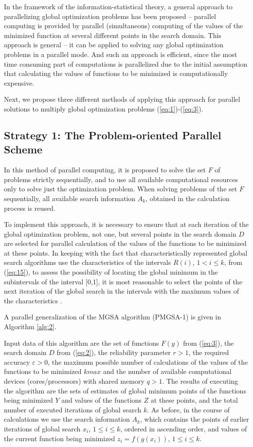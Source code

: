 \documentclass[review]{elsarticle}
\begin{document}
In the framework of the information-statistical theory, a general approach to parallelizing global optimization problems has been proposed -- parallel computing is provided by parallel (simultaneous) computing of the values of the minimized function at several different points in the search domain. This approach is general -- it can be applied to solving any global optimization problems in a parallel mode. And such an approach is efficient, since the most time consuming part of computations is parallelized due to the initial assumption that calculating the values of functions to be minimized is computationally expensive.

Next, we propose three different methods of applying this approach for parallel solutions to multiply global optimization problems (\ref{eq:1})-(\ref{eq:3}).

\subsection{Strategy 1: The Problem-oriented Parallel Scheme} \label{subsec:1}

In this method of parallel computing, it is proposed to solve the set $F$ of problems strictly sequentially, and to use all available computational resources only to solve just the optimization problem. When solving problems of the set $F$ sequentially, all available search information $A_k$, obtained in the calculation process is reused. 

To implement this approach, it is necessary to ensure that at each iteration of the global optimization problem, not one, but several points in the search domain $D$ are selected for parallel calculation of the values of the functions to be minimized at these points. In keeping with the fact that characteristically represented global search algorithms use the characteristics of the intervals $R(i)$, $1 < i \leq k$, from (\ref{eq:15}), to assess the possibility of locating the global minimum in the subintervals of the interval [0,1], it is most reasonable to select the points of the next iteration of the global search in the intervals with the maximum values of the characteristics \cite{c6}.

A parallel generalization of the MGSA algorithm (PMGSA-1) is given in Algorithm \ref{alg:2}.

Input data of this algorithm are the set of functions $F(y)$ from (\ref{eq:3}), the search domain $D$ from (\ref{eq:2}), the reliability parameter $r>1$, the required accuracy $\varepsilon > 0$, the maximum possible number of calculations of the values of the functions to be minimized $kmax$ and the number of available computational devices ({cores/processors}) with shared memory $q>1$. The results of executing the algorithm are the sets of estimates of global minimum points of the functions being minimized $Y$ and values of the functions $Z$ at these points, and the total number of executed iterations of global search $k$. As before, in the course of calculations we use the search information $A_k$, which contains the points of earlier iterations of global search $x_i$, $1 \leq i \leq k$, ordered in ascending order, and values of the current function being minimized $z_i=f(y(x_i))$, $1 \leq i \leq k$.
\end{document}
